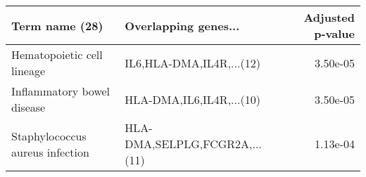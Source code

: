 \begin{tabular}{llr}
\toprule
                 Term name (28) &          Overlapping genes... &  Adjusted p-value \\
\midrule
     Hematopoietic cell lineage &      IL6,HLA-DMA,IL4R,...(12) &          3.50e-05 \\
     Inflammatory bowel disease &      HLA-DMA,IL6,IL4R,...(10) &          3.50e-05 \\
Staphylococcus aureus infection & HLA-DMA,SELPLG,FCGR2A,...(11) &          1.13e-04 \\
\bottomrule
\end{tabular}
